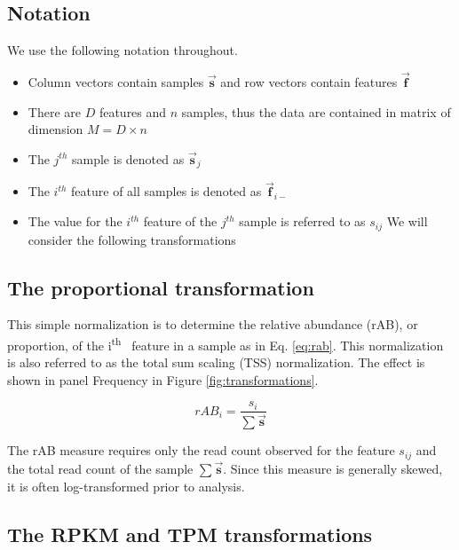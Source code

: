 \documentclass[onecolumn]{book}
\providecommand{\tightlist}{%
  \setlength{\itemsep}{0pt}\setlength{\parskip}{0pt}}
\newcommand{\ith}[1]{ #1\textsuperscript{th}\ }
\theoremstyle{definition}
\theoremstyle{definition}
\theoremstyle{definition}
\theoremstyle{remark}
\begin{document}
\hypertarget{notation}{%
\subsection{Notation}\label{notation}}

We use the following notation throughout.

\begin{itemize}
\tightlist
\item
  Column vectors contain samples \(\vec{\textbf{s}}\) and row vectors
  contain features \(\vec{\textbf{f}}\)
\item
  There are \(D\) features and \(n\) samples, thus the data are
  contained in matrix of dimension \(M = D \times n\)
\item
  The \(j^{th}\) sample is denoted as \(\vec{\textbf{s}}_{j}\)
\item
  The \(i^{th}\) feature of all samples is denoted as
  \(\vec{\textbf{f}}_{i-}\)
\item
  The value for the \(i^{th}\) feature of the \(j^{th}\) sample is
  referred to as \(s_{ij}\) We will consider the following
  transformations
\end{itemize}

\hypertarget{the-proportional-transformation}{%
\subsection{The proportional
transformation}\label{the-proportional-transformation}}

This simple normalization is to determine the relative abundance (rAB),
or proportion, of the \ith{i} feature in a sample as in Eq.
\ref{eq:rab}. This normalization is also referred to as the total sum
scaling (TSS) normalization. The effect is shown in panel Frequency in
Figure \ref{fig:transformations}.

\begin{equation}
    rAB_{i} = \frac{s_{i}}{\sum{\vec{\textbf{s}}}}
    \label{eq:rab}
\end{equation}

The rAB measure requires only the read count observed for the feature
\(s_{ij}\) and the total read count of the sample
\(\sum{\vec{\textbf{s}}}\). Since this measure is generally skewed, it
is often log-transformed prior to analysis.

\hypertarget{the-rpkm-and-tpm-transformations}{%
\subsection{The RPKM and TPM
transformations}\label{the-rpkm-and-tpm-transformations}}
\end{document}
